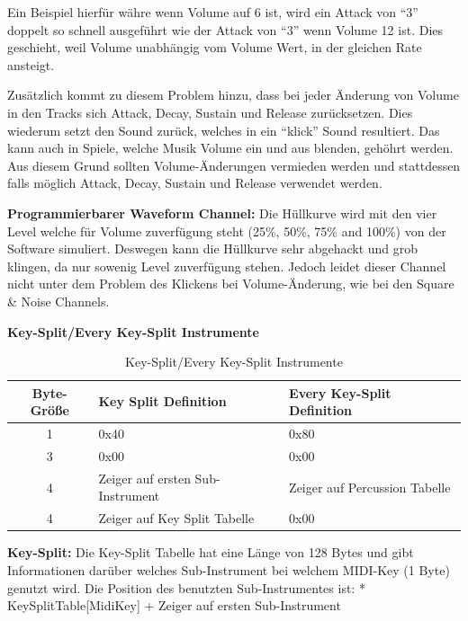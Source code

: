\documentclass[11pt,a4paper]{scrartcl}
\begin{document}
Ein Beispiel hierf\"{u}r w\"{a}hre wenn Volume auf 6 ist, wird ein Attack von "`3"' doppelt so schnell ausgef\"{u}hrt wie der Attack von "`3"' wenn Volume 12 ist. Dies geschieht, weil Volume unabh\"{a}ngig vom Volume Wert, in der gleichen Rate ansteigt.

Zus\"{a}tzlich kommt zu diesem Problem hinzu, dass bei jeder \"{A}nderung von Volume in den Tracks sich Attack, Decay, Sustain und Release zur\"{u}cksetzen. Dies wiederum setzt den Sound zur\"{u}ck, welches in ein "`klick"' Sound resultiert. Das kann auch in Spiele, welche Musik Volume ein und aus blenden, geh\"{o}hrt werden. Aus diesem Grund sollten Volume-\"{A}nderungen vermieden werden und stattdessen falls m\"{o}glich Attack, Decay, Sustain und Release verwendet werden.

\textbf{Programmierbarer Waveform Channel:}\newline
Die H\"{u}llkurve wird mit den vier Level welche f\"{u}r Volume zuverf\"{u}gung steht (25\%, 50\%, 75\% and 100\%) von der Software simuliert. Deswegen kann die H\"{u}llkurve sehr abgehackt und grob klingen, da nur sowenig Level zuverf\"{u}gung stehen. Jedoch leidet dieser Channel nicht unter dem Problem des Klickens bei Volume-\"{A}nderung, wie bei den Square \& Noise Channels.



\newpage

\textbf{{\large Key-Split/Every Key-Split Instrumente}}

\begin{table}[h]
    \centering
    \begin{tabular}{ c | p{} | p{}}
        \textbf{Byte-Gr\"{o}{\ss}e} & \textbf{Key Split Definition} & \textbf{Every Key-Split Definition}\\
        \hline
        1 & 0x40 & 0x80\\
				\hline
        3 & 0x00 & 0x00\\
				\hline
        4 & Zeiger auf ersten Sub-Instrument & Zeiger auf Percussion Tabelle \\
				\hline
        4 & Zeiger auf Key Split Tabelle & 0x00\\
    \end{tabular}
    \caption{Key-Split/Every Key-Split Instrumente}
    \label{table:EveryKey-SplitInstrument}
\end{table}


\textbf{Key-Split:}\newline
Die Key-Split Tabelle hat eine L\"{a}nge von 128 Bytes und gibt Informationen dar\"{u}ber welches Sub-Instrument bei welchem MIDI-Key (1 Byte) genutzt wird. 
Die Position des benutzten Sub-Instrumentes ist: * KeySplitTable[MidiKey] + Zeiger auf ersten Sub-Instrument
\end{document}
